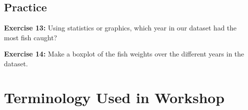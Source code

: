 \documentclass[]{article}
\begin{document}
\vspace{0.25cm}

\subsection{Practice}\label{practice-2}

\textbf{Exercise 13:} Using statistics or graphics, which year in our
dataset had the most fish caught?

\vspace{2cm}

\textbf{Exercise 14:} Make a boxplot of the fish weights over the
different years in the dataset.

\newpage 

\section{Terminology Used in
Workshop}\label{terminology-used-in-workshop}
\end{document}
